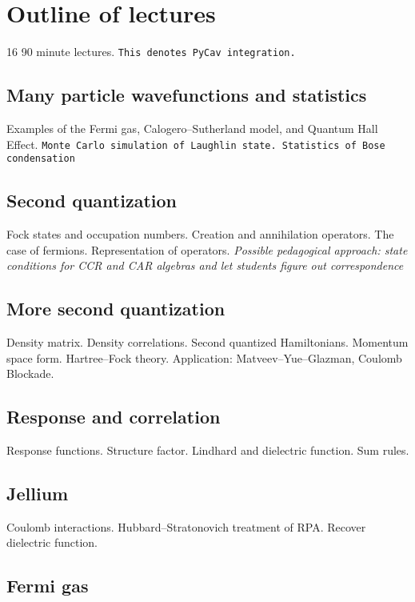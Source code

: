 \section{Outline of lectures}

16 90 minute lectures. \verb|This denotes PyCav integration.|

\subsection{Many particle wavefunctions and statistics}

Examples of the Fermi gas, Calogero--Sutherland model, and Quantum Hall Effect. \verb|Monte Carlo simulation of Laughlin state. Statistics of Bose condensation|

\subsection{Second quantization}

Fock states and occupation numbers. Creation and annihilation operators. The case of fermions. Representation of operators. \textit{Possible pedagogical approach: state conditions for CCR and CAR algebras and let students figure out correspondence}

\subsection{More second quantization}

Density matrix. Density correlations. Second quantized Hamiltonians. Momentum space form. Hartree--Fock theory. Application: Matveev--Yue--Glazman, Coulomb Blockade. 

\subsection{Response and correlation}

Response functions. Structure factor. Lindhard and dielectric function. Sum rules.

\subsection{Jellium}

Coulomb interactions. Hubbard--Stratonovich treatment of RPA. Recover dielectric function.

\subsection{Fermi gas}

